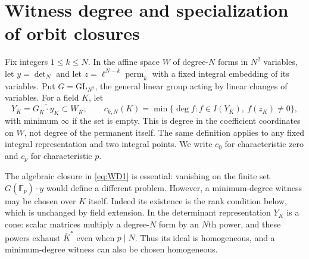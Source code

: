 \section{Witness degree and specialization of orbit closures}
Fix integers $1\le k\le N$.  In the affine space $W$ of degree-$N$
forms in $N^2$ variables, let $y=\det_N$ and let
$z=\ell^{N-k}\operatorname{perm}_k$ with a fixed integral embedding
of its variables.  Put $G=\mathrm{GL}_{N^2}$, the general linear group acting by linear changes of variables.  For a field $K$, let
\begin{equation}
 Y_K=\overline{G_{\overline K}\cdot y_K}\subset W_{\overline K},
 \qquad
 c_{k,N}(K)=\min\{\deg f:f\in I(Y_K),\ f(z_K)\ne0\},
\label{eq:WD1}
\end{equation}
with minimum $\infty$ if the set is empty.  This is degree in the
coefficient coordinates on $W$, not degree of the permanent itself.
The same definition applies to any fixed integral representation and
two integral points.  We write $c_0$ for characteristic zero and $c_p$
for characteristic $p$.

The algebraic closure in \eqref{eq:WD1} is essential: vanishing on the finite set
$G(\mathbb F_p)\cdot y$ would define a different problem.  However,
a minimum-degree witness may be chosen over $K$ itself.  Indeed its
existence is the rank condition below, which is unchanged by field
extension.  In the determinant representation $Y_K$ is a cone:
scalar matrices multiply a degree-$N$ form by an $N$th power, and these
powers exhaust $\overline K^*$ even when $p\mid N$.  Thus its ideal is
homogeneous, and a minimum-degree witness can also be chosen homogeneous.

